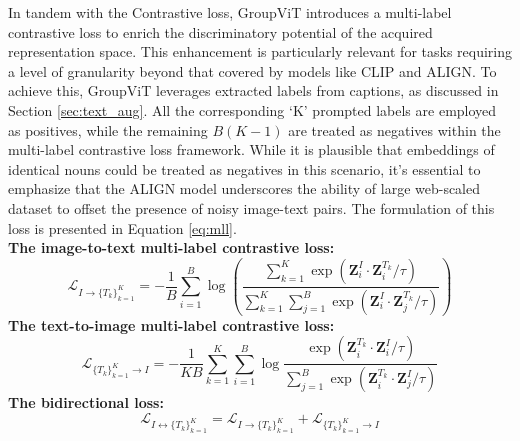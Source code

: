 In tandem with the Contrastive loss, GroupViT introduces a multi-label contrastive loss to enrich the discriminatory potential of the acquired representation space. This enhancement is particularly relevant for tasks requiring a level of granularity beyond that covered by models like CLIP and ALIGN. To achieve this, GroupViT leverages extracted labels from captions, as discussed in Section \ref{sec:text_aug}. All the corresponding `K' prompted labels are employed as positives, while the remaining $B(K-1)$ are treated as negatives within the multi-label contrastive loss framework. While it is plausible that embeddings of identical nouns could be treated as negatives in this scenario, it's essential to emphasize that the ALIGN model underscores the ability of large web-scaled dataset to offset the presence of noisy image-text pairs. The formulation of this loss is presented in Equation \ref{eq:mll}.\\
\textbf{The image-to-text multi-label contrastive loss:}
\begin{equation}
\label{eq:mll}
\mathcal{L}_{I \rightarrow \{T_k\}_{k=1}^K} = -\frac{1}{B}\sum_{i=1}^{B} \log \left( \frac{\sum_{k=1}^{K} \exp(\textbf{Z}^I_i \cdot \textbf{Z}^{T_k}_i/\tau)}{\sum_{k=1}^{K} \sum_{j=1}^{B} \exp(\textbf{Z}^I_i \cdot \textbf{Z}^{T_k}_j/\tau)} \right)
\end{equation}
\textbf{The text-to-image multi-label contrastive loss:}\\
\begin{equation}
\mathcal{L}_{\{T_k\}_{k=1}^K \rightarrow I} = -\frac{1}{KB}\sum_{k=1}^{K} \sum_{i=1}^{B} \log \frac{\exp(\textbf{Z}^{T_k}_i \cdot \textbf{Z}^{I}_i/\tau)}{\sum_{j=1}^{B} \exp(\textbf{Z}^{T_k}_i \cdot \textbf{Z}^{I}_j/\tau)}
\end{equation}
\textbf{The bidirectional loss:}
\begin{equation}
\mathcal{L}_{I \leftrightarrow \{T_k\}_{k=1}^K} = \mathcal{L}_{I \rightarrow \{T_k\}_{k=1}^K} + \mathcal{L}_{\{T_k\}_{k=1}^K \rightarrow I}
\end{equation}


%

